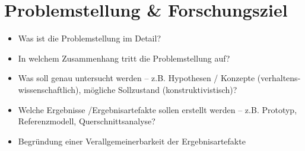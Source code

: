 \section{Problemstellung \& Forschungsziel}
\label{sec:Problemstellung}
\begin{itemize}
  \item Was ist die Problemstellung im Detail?
  \item In welchem Zusammenhang tritt die Problemstellung auf?
  \item Was soll genau untersucht werden – z.B. Hypothesen / Konzepte (verhaltens-wissenschaftlich),  mögliche Sollzustand (konstruktivistisch)?
  \item Welche Ergebnisse /Ergebnisartefakte  sollen erstellt werden – z.B. Prototyp, Referenzmodell, Querschnittsanalyse?
  \item Begründung einer Verallgemeinerbarkeit der Ergebnisartefakte
\end{itemize}
